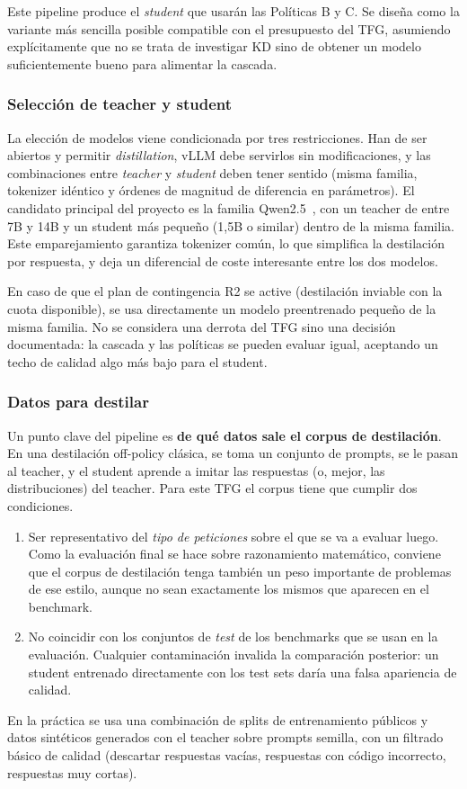 \documentclass[11pt,a4paper]{article}
\begin{document}
Este pipeline produce el \textit{student} que usarán las Políticas B y C. Se diseña como la variante más sencilla posible compatible con el presupuesto del TFG, asumiendo explícitamente que no se trata de investigar KD sino de obtener un modelo suficientemente bueno para alimentar la cascada.

\subsubsection{Selección de teacher y student}

La elección de modelos viene condicionada por tres restricciones. Han de ser abiertos y permitir \textit{distillation}, vLLM debe servirlos sin modificaciones, y las combinaciones entre \textit{teacher} y \textit{student} deben tener sentido (misma familia, tokenizer idéntico y órdenes de magnitud de diferencia en parámetros). El candidato principal del proyecto es la familia Qwen2.5~\cite{qwen2}, con un teacher de entre 7B y 14B y un student más pequeño (1,5B o similar) dentro de la misma familia. Este emparejamiento garantiza tokenizer común, lo que simplifica la destilación por respuesta, y deja un diferencial de coste interesante entre los dos modelos.

En caso de que el plan de contingencia R2 se active (destilación inviable con la cuota disponible), se usa directamente un modelo preentrenado pequeño de la misma familia. No se considera una derrota del TFG sino una decisión documentada: la cascada y las políticas se pueden evaluar igual, aceptando un techo de calidad algo más bajo para el student.

\subsubsection{Datos para destilar}

Un punto clave del pipeline es \textbf{de qué datos sale el corpus de destilación}. En una destilación off-policy clásica, se toma un conjunto de prompts, se le pasan al teacher, y el student aprende a imitar las respuestas (o, mejor, las distribuciones) del teacher. Para este TFG el corpus tiene que cumplir dos condiciones.
\begin{enumerate}[nosep,leftmargin=*]
\item Ser representativo del \textit{tipo de peticiones} sobre el que se va a evaluar luego. Como la evaluación final se hace sobre razonamiento matemático, conviene que el corpus de destilación tenga también un peso importante de problemas de ese estilo, aunque no sean exactamente los mismos que aparecen en el benchmark.
\item No coincidir con los conjuntos de \textit{test} de los benchmarks que se usan en la evaluación. Cualquier contaminación invalida la comparación posterior: un student entrenado directamente con los test sets daría una falsa apariencia de calidad.
\end{enumerate}
En la práctica se usa una combinación de splits de entrenamiento públicos y datos sintéticos generados con el teacher sobre prompts semilla, con un filtrado básico de calidad (descartar respuestas vacías, respuestas con código incorrecto, respuestas muy cortas).
\end{document}
